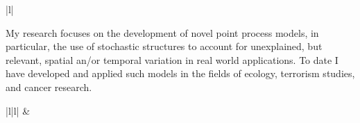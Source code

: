 \documentclass[12pt, a4paper]{article}
\begin{document}
\begin{center}\begin{tabular}{|l|}
\hline {}   \\
\hline
\end{tabular}\end{center}
\vspace{-0.3 cm} {\it {


\noindent My research focuses on the development of novel point process models, in particular, the use of stochastic structures to account for unexplained, but relevant, spatial an/or temporal variation in real world applications. To date I have developed and applied such models in the fields of ecology, terrorism studies, and cancer research.
}\par}

\begin{center}\begin{tabular}{|l|l|}
\hline {}   &    \\
\hline
\end{tabular}\end{center}
\vspace{-0.3 cm} {\it {


\noindent
}\par}
\end{document}
